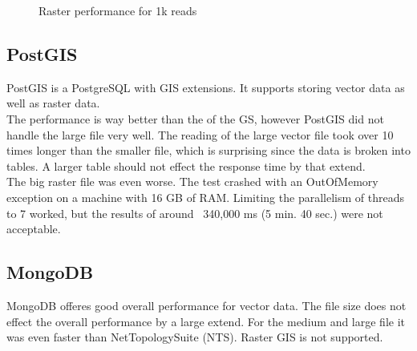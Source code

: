 \begin{figure}[H]
	\caption{Raster performance for 1k reads}
	\label{fig:raster_performace}
\end{figure}


\subsection{PostGIS}
PostGIS is a PostgreSQL with GIS extensions. It supports storing vector data as well as raster data.\\
The performance is way better than the of the GS, however PostGIS did not handle the large file very well. The reading of the large vector file took over 10 times longer than the smaller file, which is surprising since the data is broken into tables. A larger table should not effect the response time by that extend.\\
The big raster file was even worse. The test crashed with an OutOfMemory exception on a machine with 16 GB of RAM. Limiting the parallelism of threads to 7 worked, but the results of around ~340,000 ms (5 min. 40 sec.) were not acceptable.


\subsection{MongoDB}
MongoDB offeres good overall performance for vector data. The file size does not effect the overall performance by a large extend. For the medium and large file it was even faster than NetTopologySuite (NTS). Raster GIS is not supported.


